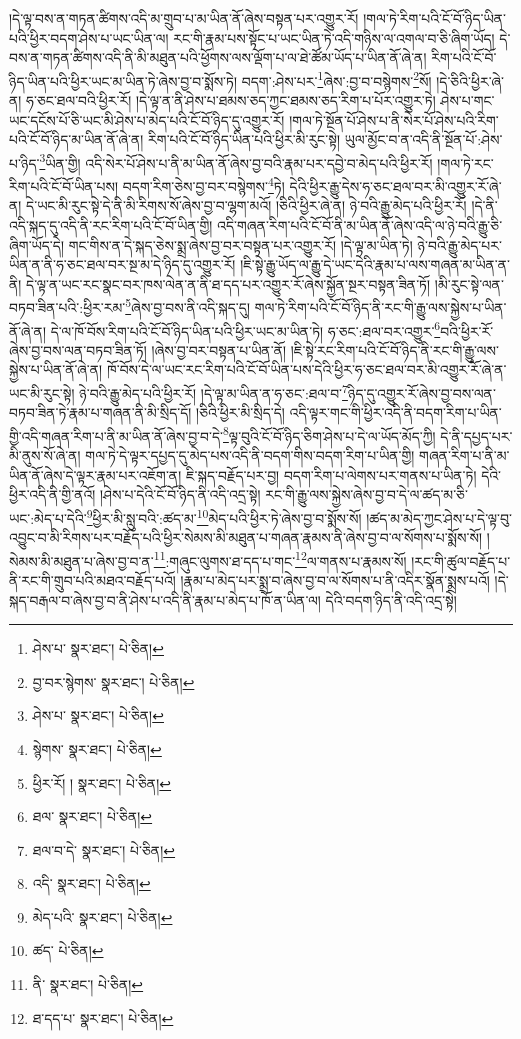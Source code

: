 །དེ་ལྟ་བས་ན་གཏན་ཚིགས་འདི་མ་གྲུབ་པ་མ་ཡིན་ནོ་ཞེས་བསྟན་པར་འགྱུར་རོ། །གལ་ཏེ་རིག་པའི་ངོ་བོ་ཉིད་ཡིན་པའི་ཕྱིར་བདག་ཤེས་པ་ཡང་ཡིན་ལ། རང་གི་རྣམ་པས་སྟོང་པ་ཡང་ཡིན་ཏེ་འདི་གཉིས་ལ་འགལ་བ་ཅི་ཞིག་ཡོད། དེ་བས་ན་གཏན་ཚིགས་འདི་ནི་མི་མཐུན་པའི་ཕྱོགས་ལས་ལྡོག་པ་ལ་ཐེ་ཚོམ་ཡོད་པ་ཡིན་ནོ་ཞེ་ན། རིག་པའི་ངོ་བོ་ཉིད་ཡིན་པའི་ཕྱིར་ཡང་མ་ཡིན་ཏེ་ཞེས་བྱ་བ་སྨོས་ཏེ། བདག་:ཤེས་པར་\footnote{ཤེས་པ་  སྣར་ཐང་།  པེ་ཅིན། }ཞེས་:བྱ་བ་བསྙེགས་\footnote{བྱ་བར་སྙེགས་  སྣར་ཐང་།  པེ་ཅིན། }སོ། །དེ་ཅིའི་ཕྱིར་ཞེ་ན། ཧ་ཅང་ཐལ་བའི་ཕྱིར་རོ། །དེ་ལྟ་ན་ནི་ཤེས་པ་ཐམས་ཅད་ཀྱང་ཐམས་ཅད་རིག་པ་པོར་འགྱུར་ཏེ། ཤེས་པ་གང་ཡང་དངོས་པོ་ཅི་ཡང་མི་ཤེས་པ་མེད་པའི་ངོ་བོ་ཉིད་དུ་འགྱུར་རོ། །གལ་ཏེ་སྔོན་པོ་ཤེས་པ་ནི་སེར་པོ་ཤེས་པའི་རིག་པའི་ངོ་བོ་ཉིད་མ་ཡིན་ནོ་ཞེ་ན། རིག་པའི་ངོ་བོ་ཉིད་ཡིན་པའི་ཕྱིར་མི་རུང་སྟེ། ཡུལ་མྱོང་བ་ན་འདི་ནི་སྔོན་པོ་:ཤེས་པ་ཉིད་\footnote{ཤེས་པ་  སྣར་ཐང་།  པེ་ཅིན། }ཡིན་གྱི། འདི་སེར་པོ་ཤེས་པ་ནི་མ་ཡིན་ནོ་ཞེས་བྱ་བའི་རྣམ་པར་དབྱེ་བ་མེད་པའི་ཕྱིར་རོ། །གལ་ཏེ་རང་རིག་པའི་ངོ་བོ་ཡིན་པས། བདག་རིག་ཅེས་བྱ་བར་བསྙེགས་\footnote{སྙེགས་  སྣར་ཐང་།  པེ་ཅིན། }ཏེ། དེའི་ཕྱིར་རྒྱུ་དེས་ཧ་ཅང་ཐལ་བར་མི་འགྱུར་རོ་ཞེ་ན། དེ་ཡང་མི་རུང་སྟེ་དེ་ནི་མི་རིགས་སོ་ཞེས་བྱ་བ་ལྷག་མའོ། །ཅིའི་ཕྱིར་ཞེ་ན། ཉེ་བའི་རྒྱུ་མེད་པའི་ཕྱིར་རོ། །དེ་ནི་འདི་སྐད་དུ་འདི་ནི་རང་རིག་པའི་ངོ་བོ་ཡིན་གྱི། འདི་གཞན་རིག་པའི་ངོ་བོ་ནི་མ་ཡིན་ནོ་ཞེས་འདི་ལ་ཉེ་བའི་རྒྱུ་ཅི་ཞིག་ཡོད་དེ། གང་གིས་ན་དེ་སྐད་ཅེས་སྨྲ་ཞེས་བྱ་བར་བསྟན་པར་འགྱུར་རོ། །དེ་ལྟ་མ་ཡིན་ཏེ། ཉེ་བའི་རྒྱུ་མེད་པར་ཡིན་ན་ནི་ཧ་ཅང་ཐལ་བར་སྔ་མ་དེ་ཉིད་དུ་འགྱུར་རོ། །ཇི་སྟེ་རྒྱུ་ཡོད་ལ་རྒྱུ་དེ་ཡང་དེའི་རྣམ་པ་ལས་གཞན་མ་ཡིན་ན་ནི། དེ་ལྟ་ན་ཡང་རང་སྣང་བར་ཁས་ལེན་ན་ནི་ཐ་དད་པར་འགྱུར་རོ་ཞེས་སྐྱོན་སྔར་བསྟན་ཟིན་ཏོ། །མི་རུང་སྟེ་ལན་བཏབ་ཟིན་པའི་:ཕྱིར་རམ་\footnote{ཕྱིར་རོ། །  སྣར་ཐང་།  པེ་ཅིན། }ཞེས་བྱ་བས་ནི་འདི་སྐད་དུ། གལ་ཏེ་རིག་པའི་ངོ་བོ་ཉིད་ནི་རང་གི་རྒྱུ་ལས་སྐྱེས་པ་ཡིན་ནོ་ཞེ་ན། དེ་ལ་ཁོ་བོས་རིག་པའི་ངོ་བོ་ཉིད་ཡིན་པའི་ཕྱིར་ཡང་མ་ཡིན་ཏེ། ཧ་ཅང་:ཐལ་བར་འགྱུར་\footnote{ཐལ་  སྣར་ཐང་།  པེ་ཅིན། }བའི་ཕྱིར་རོ་ཞེས་བྱ་བས་ལན་བཏབ་ཟིན་ཏོ། །ཞེས་བྱ་བར་བསྟན་པ་ཡིན་ནོ། །ཇི་སྟེ་རང་རིག་པའི་ངོ་བོ་ཉིད་ནི་རང་གི་རྒྱུ་ལས་སྐྱེས་པ་ཡིན་ནོ་ཞེ་ན། ཁོ་བོས་དེ་ལ་ཡང་རང་རིག་པའི་ངོ་བོ་ཡིན་པས་དེའི་ཕྱིར་ཧ་ཅང་ཐལ་བར་མི་འགྱུར་རོ་ཞེ་ན་ཡང་མི་རུང་སྟེ། ཉེ་བའི་རྒྱུ་མེད་པའི་ཕྱིར་རོ། །དེ་ལྟ་མ་ཡིན་ན་ཧ་ཅང་:ཐལ་བ་\footnote{ཐལ་བ་དེ་  སྣར་ཐང་།  པེ་ཅིན། }ཉིད་དུ་འགྱུར་རོ་ཞེས་བྱ་བས་ལན་བཏབ་ཟིན་ཏེ་རྣམ་པ་གཞན་ནི་མི་སྲིད་དོ། །ཅིའི་ཕྱིར་མི་སྲིད་དེ། འདི་ལྟར་གང་གི་ཕྱིར་འདི་ནི་བདག་རིག་པ་ཡིན་གྱི་འདི་གཞན་རིག་པ་ནི་མ་ཡིན་ནོ་ཞེས་བྱ་བ་དེ་\footnote{འདི་  སྣར་ཐང་།  པེ་ཅིན། }ལྟ་བུའི་ངོ་བོ་ཉིད་ཅིག་ཤེས་པ་དེ་ལ་ཡོད་མོད་ཀྱི། དེ་ནི་དཔྱད་པར་མི་ནུས་སོ་ཞེ་ན། གལ་ཏེ་དེ་ལྟར་དཔྱད་དུ་མེད་པས་འདི་ནི་བདག་གིས་བདག་རིག་པ་ཡིན་གྱི། གཞན་རིག་པ་ནི་མ་ཡིན་ནོ་ཞེས་དེ་ལྟར་རྣམ་པར་འཇོག་ན། ཇི་སྐད་བརྗོད་པར་བྱ། བདག་རིག་པ་ལེགས་པར་གནས་པ་ཡིན་ཏེ། དེའི་ཕྱིར་འདི་ནི་གྱི་ནའོ། །ཤེས་པ་དེའི་ངོ་བོ་ཉིད་ནི་འདི་འདྲ་སྟེ། རང་གི་རྒྱུ་ལས་སྐྱེས་ཞེས་བྱ་བ་དེ་ལ་ཚད་མ་ཅི་ཡང་:མེད་པ་དེའི་\footnote{མེད་པའི་  སྣར་ཐང་།  པེ་ཅིན། }ཕྱིར་མི་སླུ་བའི་:ཚད་མ་\footnote{ཚད་  པེ་ཅིན། }མེད་པའི་ཕྱིར་ཏེ་ཞེས་བྱ་བ་སྨོས་སོ། །ཚད་མ་མེད་ཀྱང་ཤེས་པ་དེ་ལྟ་བུ་འབྱུང་བ་མི་རིགས་པར་བརྗོད་པའི་ཕྱིར་སེམས་མི་མཐུན་པ་གཞན་རྣམས་ནི་ཞེས་བྱ་བ་ལ་སོགས་པ་སྨོས་སོ། །སེམས་མི་མཐུན་པ་ཞེས་བྱ་བ་ན་\footnote{ནི་  སྣར་ཐང་།  པེ་ཅིན། }:གཞུང་ལུགས་ཐ་དད་པ་གང་\footnote{ཐ་དད་པ་  སྣར་ཐང་།  པེ་ཅིན། }ལ་གནས་པ་རྣམས་སོ། །རང་གི་ཚུལ་བརྗོད་པ་ནི་རང་གི་གྲུབ་པའི་མཐའ་བརྗོད་པའོ། །རྣམ་པ་མེད་པར་སྨྲ་བ་ཞེས་བྱ་བ་ལ་སོགས་པ་ནི་འདིར་སྣོན་སྨྲས་པའོ། །དེ་སྐད་བརྒལ་བ་ཞེས་བྱ་བ་ནི་ཤེས་པ་འདི་ནི་རྣམ་པ་མེད་པ་ཁོ་ན་ཡིན་ལ། དེའི་བདག་ཉིད་ནི་འདི་འདྲ་སྟེ། 